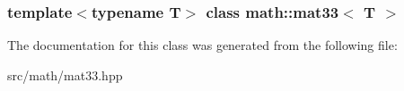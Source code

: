 \subsubsection*{template$<$typename T$>$ class math::mat33$<$ T $>$}



The documentation for this class was generated from the following file:\begin{DoxyCompactItemize}
\item 
src/math/mat33.hpp\end{DoxyCompactItemize}
